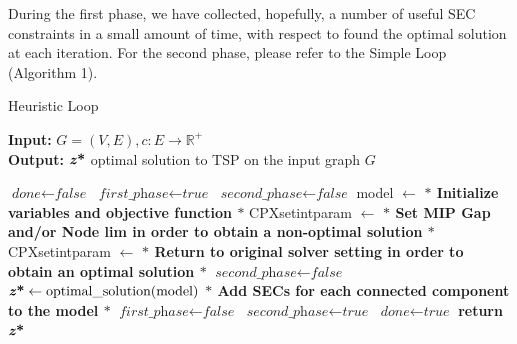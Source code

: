 During the first phase, we have collected, hopefully, a number of useful SEC constraints in a small amount of time, with respect to found the optimal solution at each iteration.
For the second phase, please refer to the Simple Loop (Algorithm 1).
\begin{algorithm}
    \caption{Heuristic Loop}\label{Loop Method}
    \hspace*{\algorithmicindent} \textbf{Input:} $G = (V,E) , c : E \rightarrow \mathbb{R}^+$\\
    \hspace*{\algorithmicindent} \textbf{Output:} $\textbf{\textit{z}\text{*}} $ optimal solution to TSP on the input graph $G$
    \begin{algorithmic}[1]
    \State $\textit{done} \gets \textit{false}$
    \State $\textit{first\_phase} \gets \textit{true}$
    \State $\textit{second\_phase} \gets \textit{false}$
    \State model $ \leftarrow $ \textbf{$\ast$ Initialize variables and objective function $\ast$ }
    \State CPXsetintparam $ \leftarrow $ \textbf{$\ast$ Set MIP Gap and/or Node lim in order to obtain a non-optimal solution $\ast$ }
	\State CPXsetintparam $ \leftarrow $\textbf{ $\ast$ Return to original solver setting in order to obtain an optimal solution $\ast$ }
	\State $\textit{second\_phase} \gets \textit{false}$
	\EndIf
    	\State $\textbf{\textit{z}\text{*}}  \gets \text{optimal\_solution}(\text{model})$\;
	\State \textbf{ $\ast$ Add SECs for each connected component to the model $\ast$ }
	\EndIf
	\State $\textit{first\_phase} \gets \textit{false}$
	\State $\textit{second\_phase} \gets \textit{true}$
	\EndIf
	\State $\textit{done} \gets \textit{true}$
	\EndIf
    \EndWhile
    \State \textbf{return} $\textbf{\textit{z}\text{*}} $
    \end{algorithmic}
    \label{alg:heuloop}
    \end{algorithm}
    
\newpage

